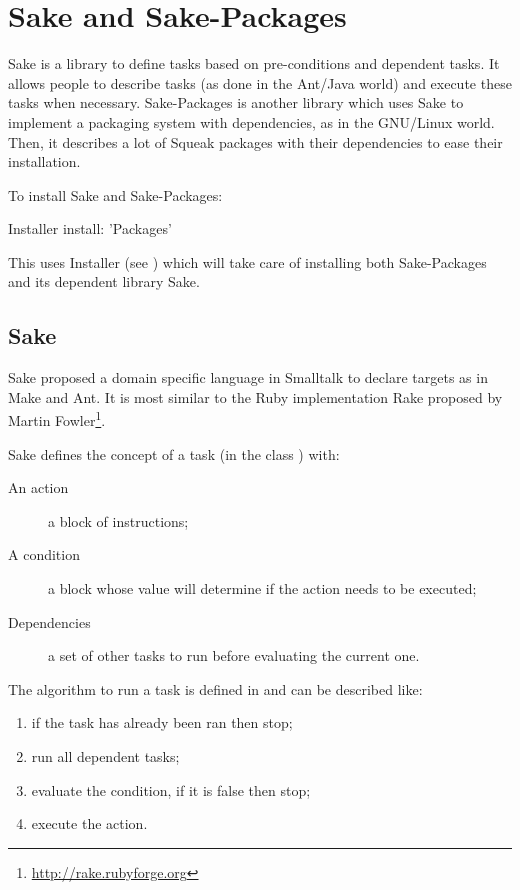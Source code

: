 \documentclass[a4paper,10pt,twoside]{book}
\begin{document}
\fi
\sloppy
\chapter{Sake and Sake-Packages}
\label{cha:sake}

Sake is a library to define tasks based on pre-conditions and
dependent tasks. It allows people to describe tasks (as done in the
Ant/Java world) and execute these tasks when necessary.  Sake-Packages is
another library which uses Sake to implement a packaging system with
dependencies, as in the GNU/Linux world. Then, it describes a lot of
Squeak packages with their dependencies to ease their installation.

To install Sake and Sake-Packages:

\begin{code}
  Installer install: 'Packages'
\end{code}

This uses Installer (see ) which will take care of
installing both Sake-Packages and its dependent library Sake.

\section{Sake}
\label{sec:sake}

Sake proposed a domain specific language in Smalltalk to declare
targets as in Make and Ant. It is most similar to the Ruby
implementation Rake proposed by Martin
Fowler\footnote{\url{http://rake.rubyforge.org}}.

Sake defines the concept of a task (in the class ) with:
\begin{description}
\item[An action] a block of instructions;
\item[A condition] a block whose value will determine if the action
  needs to be executed;
\item[Dependencies] a set of other tasks to run before evaluating the
  current one.
\end{description}

The algorithm to run a task is defined in
 and can be described like:

\begin{enumerate}
\item if the task has already been ran then stop;
\item run all dependent tasks;
\item evaluate the condition, if it is false then stop;
\item execute the action.
\end{enumerate}
\end{document}
